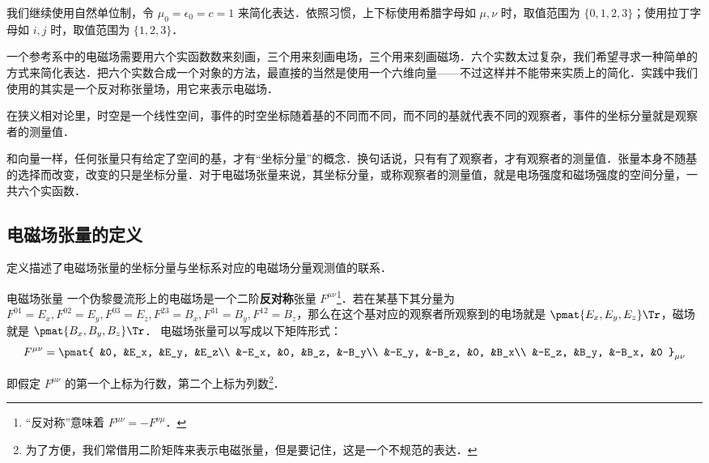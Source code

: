 

我们继续使用自然单位制，令 $\mu_0=\epsilon_0=c=1$ 来简化表达．依照习惯，上下标使用希腊字母如 $\mu, \nu$ 时，取值范围为 $\{0, 1, 2, 3\}$；使用拉丁字母如 $i, j$ 时，取值范围为 $\{1, 2, 3\}$．

一个参考系中的电磁场需要用六个实函数数来刻画，三个用来刻画电场，三个用来刻画磁场．六个实数太过复杂，我们希望寻求一种简单的方式来简化表达．把六个实数合成一个对象的方法，最直接的当然是使用一个六维向量——不过这样并不能带来实质上的简化．实践中我们使用的其实是一个反对称张量场，用它来表示电磁场．

在狭义相对论里，时空是一个线性空间，事件的时空坐标随着基的不同而不同，而不同的基就代表不同的观察者，事件的坐标分量就是观察者的测量值．

和向量一样，任何张量只有给定了空间的基，才有“坐标分量”的概念．换句话说，只有有了观察者，才有观察者的测量值．张量本身不随基的选择而改变，改变的只是坐标分量．对于电磁场张量来说，其坐标分量，或称观察者的测量值，就是电场强度和磁场强度的空间分量，一共六个实函数．

\subsection{电磁场张量的定义}

定义描述了电磁场张量的坐标分量与坐标系对应的电磁场分量观测值的联系．

\begin{definition}{电磁场张量}
一个伪黎曼流形上的电磁场是一个二阶\textbf{反对称}张量 $F^{\mu\nu}$\footnote{“反对称”意味着 $F^{\mu\nu}=-F^{\nu\mu}$．}．若在某基下其分量为 $F^{01}=E_x, F^{02}=E_y, F^{03}=E_z, F^{23}=B_x, F^{31}=B_y, F^{12}=B_z$，那么在这个基对应的观察者所观察到的电场就是 $\pmat{E_x, E_y, E_z}\Tr$，磁场就是 $\pmat{B_x, B_y, B_z}\Tr$．
电磁场张量可以写成以下矩阵形式：
\begin{equation}\label{EMFT_eq1}
F^{\mu\nu}=\pmat{
&0, &E_x, &E_y, &E_z\\
&-E_x, &0, &B_z, &-B_y\\
&-E_y, &-B_z, &0, &B_x\\
&-E_z, &B_y, &-B_x, &0
}_{\mu\nu}
\end{equation}
\end{definition}
即假定 $F^{\mu\nu}$ 的第一个上标为行数，第二个上标为列数\footnote{为了方便，我们常借用二阶矩阵来表示电磁张量，但是要记住，这是一个不规范的表达．}．

